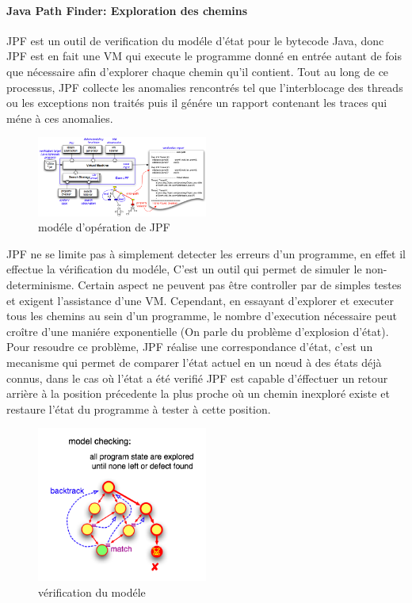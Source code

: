     \paragraph{Java Path Finder: Exploration des chemins}
      \gls{JPF} est un outil de verification du modéle d'état pour le bytecode Java,
      donc \gls{JPF} est en fait une \gls{VM} qui execute le programme donné en entrée autant de fois que nécessaire
      afin d'explorer chaque chemin qu'il contient.
      Tout au long de ce processus, \gls{JPF} collecte les anomalies rencontrés tel que l'interblocage des threads ou les exceptions non traités puis
      il génére un rapport contenant les traces qui méne à ces anomalies.
      \begin{figure}
	\centering
	  \includegraphics[width=0.5\textwidth]{images/jpf-model.png}
	\caption{modéle d'opération de \gls{JPF}}
      \end{figure}
      \gls{JPF} ne se limite pas à simplement detecter les erreurs d'un programme, en effet il effectue la vérification du modéle,
      C'est un outil qui permet de simuler le non-determinisme. Certain aspect ne peuvent pas être controller par de simples testes
      et exigent l'assistance d'une \gls{VM}.
      Cependant, en essayant d'explorer et executer tous les chemins au sein d'un programme, le nombre d'execution nécessaire peut
      croître d'une maniére exponentielle (On parle du problème d'explosion d'état). Pour resoudre ce problème, \gls{JPF} réalise une
      correspondance d'état, c'est un mecanisme qui permet de comparer l'état actuel en un n\oe{}ud à des états déjà connus, dans le cas où l'état
      a été verifié \gls{JPF} est capable d'éffectuer un retour arrière à la position précedente la plus proche où un chemin inexploré existe et 
      restaure l'état du programme à tester à cette position.
      \begin{figure}
	\centering
	  \includegraphics[width=0.5\textwidth]{images/jpf-model-checking.png}
	\caption{vérification du modéle}
      \end{figure}
      \nocite{JPF}

